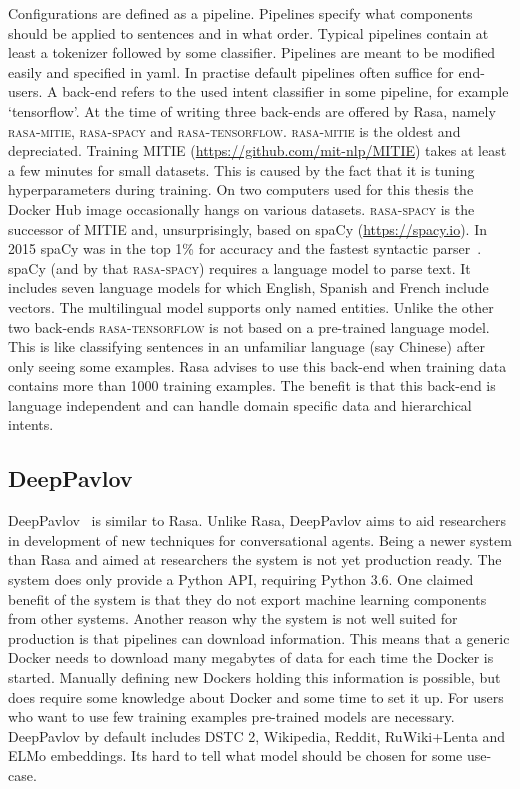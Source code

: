 Configurations are defined as a pipeline.
Pipelines specify what components should be applied to sentences and in what order.
Typical pipelines contain at least a tokenizer followed by some classifier.
Pipelines are meant to be modified easily and specified in yaml.
In practise default pipelines often suffice for end-users.
A back-end refers to the used intent classifier in some pipeline, for example `tensorflow'.
At the time of writing three back-ends are offered by Rasa, namely \textsc{rasa-mitie}, \textsc{rasa-spacy} and \textsc{rasa-tensorflow}.
\textsc{rasa-mitie} is the oldest and depreciated.
Training MITIE (\url{https://github.com/mit-nlp/MITIE}) takes at least a few minutes for small datasets.
This is caused by the fact that it is tuning hyperparameters during training.
On two computers used for this thesis the Docker Hub image occasionally hangs on various datasets.
\textsc{rasa-spacy} is the successor of MITIE and, unsurprisingly, based on spaCy (\url{https://spacy.io}).
In 2015 spaCy was in the top 1\% for accuracy and the fastest syntactic parser~\citep{choi2015depends}.
spaCy (and by that \textsc{rasa-spacy}) requires a language model to parse text.
It includes seven language models for which English, Spanish and French include vectors.
The multilingual model supports only named entities.
Unlike the other two back-ends \textsc{rasa-tensorflow} is not based on a pre-trained language model.
This is like classifying sentences in an unfamiliar language (say Chinese) after only seeing some examples.
Rasa advises to use this back-end when training data contains more than 1000 training examples.
The benefit is that this back-end is language independent and can handle domain specific data and hierarchical intents.

\subsection{DeepPavlov}
\label{subsec:deeppavlov}
DeepPavlov~\citep{burtsev2018} is similar to Rasa.
Unlike Rasa, DeepPavlov aims to aid researchers in development of new techniques for conversational agents.
Being a newer system than Rasa and aimed at researchers the system is not yet production ready.
The system does only provide a Python API, requiring Python 3.6.
One claimed benefit of the system is that they do not export machine learning components from other systems.
Another reason why the system is not well suited for production is that pipelines can download information.
This means that a generic Docker needs to download many megabytes of data for each time the Docker is started.
Manually defining new Dockers holding this information is possible, but does require some knowledge about Docker and some time to set it up.
For users who want to use few training examples pre-trained models are necessary.
DeepPavlov by default includes DSTC 2, Wikipedia, Reddit, RuWiki+Lenta and ELMo embeddings.
Its hard to tell what model should be chosen for some use-case.


